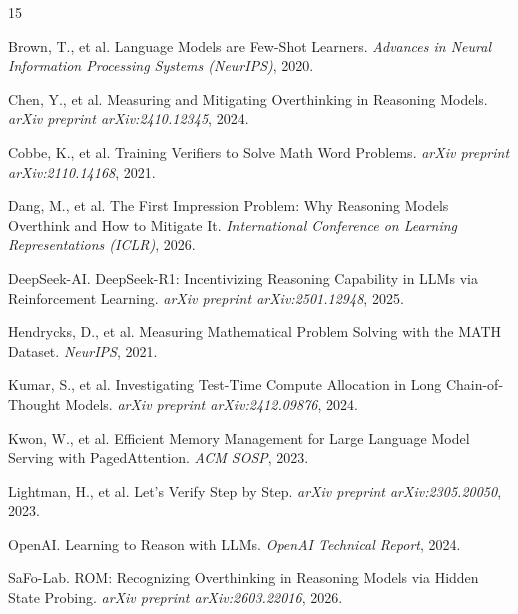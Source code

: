 \documentclass[10pt,twocolumn]{article}
\begin{document}

\begin{thebibliography}{15}
\small
\setlength{\itemsep}{2pt plus 0.5pt minus 0.5pt}

Brown, T., et al.
\newblock Language Models are Few-Shot Learners.
\newblock \emph{Advances in Neural Information Processing Systems (NeurIPS)}, 2020.

Chen, Y., et al.
\newblock Measuring and Mitigating Overthinking in Reasoning Models.
\newblock \emph{arXiv preprint arXiv:2410.12345}, 2024.

Cobbe, K., et al.
\newblock Training Verifiers to Solve Math Word Problems.
\newblock \emph{arXiv preprint arXiv:2110.14168}, 2021.

Dang, M., et al.
\newblock The First Impression Problem: Why Reasoning Models Overthink and How to Mitigate It.
\newblock \emph{International Conference on Learning Representations (ICLR)}, 2026.

DeepSeek-AI.
\newblock DeepSeek-R1: Incentivizing Reasoning Capability in LLMs via Reinforcement Learning.
\newblock \emph{arXiv preprint arXiv:2501.12948}, 2025.

Hendrycks, D., et al.
\newblock Measuring Mathematical Problem Solving with the MATH Dataset.
\newblock \emph{NeurIPS}, 2021.

Kumar, S., et al.
\newblock Investigating Test-Time Compute Allocation in Long Chain-of-Thought Models.
\newblock \emph{arXiv preprint arXiv:2412.09876}, 2024.

Kwon, W., et al.
\newblock Efficient Memory Management for Large Language Model Serving with PagedAttention.
\newblock \emph{ACM SOSP}, 2023.

Lightman, H., et al.
\newblock Let's Verify Step by Step.
\newblock \emph{arXiv preprint arXiv:2305.20050}, 2023.

OpenAI.
\newblock Learning to Reason with LLMs.
\newblock \emph{OpenAI Technical Report}, 2024.

SaFo-Lab.
\newblock ROM: Recognizing Overthinking in Reasoning Models via Hidden State Probing.
\newblock \emph{arXiv preprint arXiv:2603.22016}, 2026.


\end{thebibliography}
\end{document}
